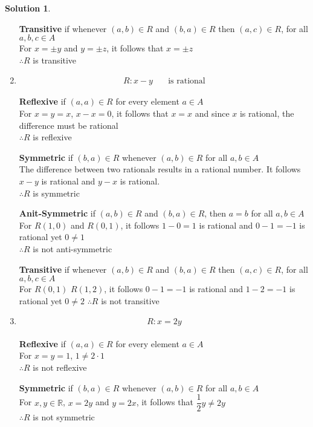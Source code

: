 \documentclass{article}
\theoremstyle{definition}
\newtheorem*{solution}{Solution}
\begin{document}
\begin{solution}
\begin{enumerate}[label=(\alph*)]
      \textbf{Transitive} if whenever $(a,b) \in R$ and $(b,a) \in R$ then $(a,c) \in R$, for all $a,b,c \in A$ \\
      For $x = \pm y$ and $y = \pm z$, it follows that $x = \pm z$ \\
      $\therefore R$ is transitive

    \item \begin{align*}
            R: x - y  \quad &\text{is rational}
          \end{align*} 
  
      \textbf{Reflexive} if $(a,a) \in R$ for every element $a \in A$ \\
      For $x = y = x$, $x - x = 0 $, it follows that $ x = x$ and since $x$ is rational, the difference must be rational \\
      $\therefore R$ is reflexive
    
      \textbf{Symmetric} if $(b,a) \in R$ whenever $(a,b) \in R$ for all $a,b \in A$ \\
      The difference between two rationals results in a rational number. It follows $x-y$ is rational and $y-x$ is rational. \\
      $\therefore R$ is symmetric
    
      \textbf{Anit-Symmetric} if $(a,b) \in R$ and $(b,a) \in R$, then $a=b$ for all $a,b \in A$ \\
      For $R(1,0)$ and $R(0,1)$, it follows $1 - 0 = 1$ is rational and $0 - 1 = -1$ is rational yet $0 \neq 1$\\
      $\therefore R$ is not anti-symmetric 
    
      \textbf{Transitive} if whenever $(a,b) \in R$ and $(b,a) \in R$ then $(a,c) \in R$, for all $a,b,c \in A$ \\
      For $R(0,1)$ $R(1,2)$, it follows $0 - 1 = -1$ is rational and $1 - 2 = -1$ is rational yet $0 \neq 2$
      $\therefore R$ is not transitive

    \item $$ R: x = 2y $$ \\
  
      \textbf{Reflexive} if $(a,a) \in R$ for every element $a \in A$ \\
      For $x = y = 1$, $1  \neq 2 \cdot 1$ \\
      $\therefore R$ is not reflexive
    
      \textbf{Symmetric} if $(b,a) \in R$ whenever $(a,b) \in R$ for all $a,b \in A$ \\
      For $x,y \in \mathbb{R}$, $ x = 2y$ and $ y = 2x$, it follows that $ \dfrac{1}{2} y \neq 2y$\\
      $\therefore R$ is not symmetric
    

\end{enumerate}
\end{solution}
\end{document}
